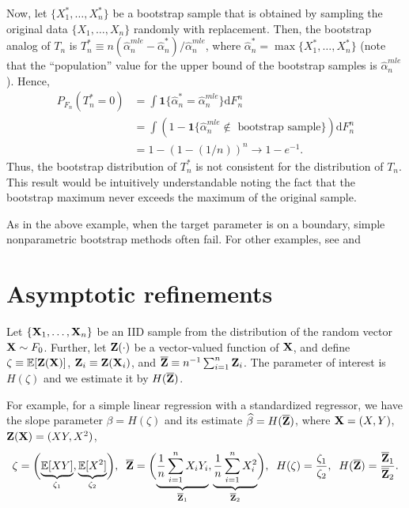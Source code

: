 \documentclass[11pt, A4paper, openany, uplatex]{book}
\begin{document}
Now, let $\{X_1^*, \ldots, X_n^*\}$ be a bootstrap sample that is obtained by sampling the original data $\{X_1, \ldots, X_n\}$ randomly with replacement.
Then, the bootstrap analog of $T_n$ is $T_n^* \equiv n(\hat \alpha_n^{mle} - \hat \alpha_n^*)/\hat \alpha_n^{mle}$, where $\hat \alpha_n^* = \max\{X_1^*, \ldots, X_n^*\}$ (note that the ``population'' value for the upper bound of the bootstrap samples is $\hat \alpha_n^{mle}$).
Hence,
\begin{align*}
	P_{F_n}(T_n^* = 0)
	& = \int \mathbf{1}\{\hat \alpha_n^* = \hat \alpha_n^{mle}\} \mathrm{d} F_n^n\\
	& = \int (1 - \mathbf{1}\{\text{$\hat \alpha_n^{mle} \not\in $ bootstrap sample}\}) \mathrm{d} F_n^n\\
	& = 1 - (1 - (1/n))^n \to 1 - e^{-1}.
\end{align*}
Thus, the bootstrap distribution of $T_n^*$ is not consistent for the distribution of $T_n$.
This result would be intuitively understandable noting the fact that the bootstrap maximum never exceeds the maximum of the original sample.

As in the above example, when the target parameter is on a boundary, simple nonparametric bootstrap methods often fail.
For other examples, see \cite{HOROWITZ20013159} and \cite{horowitz2019bootstrap}

\section{Asymptotic refinements}

Let $\{\mathbf{X}_1, \ldots, \mathbf{X}_n\}$ be an IID sample from the distribution of the random vector $\mathbf{X} \sim F_0$.
Further, let $\mathbf{Z}(\cdot)$ be a vector-valued function of $\mathbf{X}$, and define $\zeta \equiv \mathbb{E} [\mathbf{Z}(\mathbf{X})]$, $\mathbf{Z}_i \equiv \mathbf{Z}(\mathbf{X}_i)$, and $\overline{\mathbf{Z}} \equiv n^{-1} \sum_{i = 1}^n \mathbf{Z}_i$.
The parameter of interest is $H(\zeta)$ and we estimate it by $H(\overline{\mathbf{Z}})$.

For example, for a simple linear regression with a standardized regressor, we have the slope parameter $\beta = H(\zeta)$ and its estimate $\widehat \beta = H(\overline{\mathbf{Z}})$, where $\mathbf{X} = (X, Y)$, $\mathbf{Z}(\mathbf{X}) = (X Y , X^2 )$, 
\begin{align*}
	\zeta = \biggl(\underbrace{\mathbb{E}[XY]}_{\zeta_1}, \underbrace{\mathbb{E}[X^2]}_{\zeta_2}\biggr), 
	\;\; \overline{\mathbf{Z}} = \biggl(\underbrace{\frac{1}{n} \sum_{i = 1}^n X_i Y_i}_{\overline{\mathbf{Z}}_1}, \underbrace{\frac{1}{n} \sum_{i = 1}^n X_i^2}_{\overline{\mathbf{Z}}_2} \biggr),
	\;\;
	H(\zeta) = \frac{\zeta_1}{\zeta_2}, 
	\;\;  H(\overline{\mathbf{Z}}) = \frac{\overline{\mathbf{Z}}_1}{\overline{\mathbf{Z}}_2}.
\end{align*}
\end{document}
